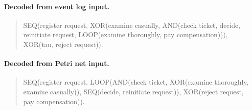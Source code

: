 \documentclass[applsci,supfile,submit,pdftex,moreauthors]{Definitions/mdpi}
\begin{document}
\paragraph{Decoded from event log input.}
\begin{quote}\ttfamily\small\raggedright
SEQ(register request, XOR(examine casually,
AND(check ticket, decide, reinitiate request,
LOOP(examine thoroughly, pay compensation))),
XOR(tau, reject request)).
\end{quote}

\paragraph{Decoded from Petri net input.}
\begin{quote}\ttfamily\small\raggedright
SEQ(register request, LOOP(AND(check ticket,
XOR(examine thoroughly, examine casually)),
SEQ(decide, reinitiate request)),
XOR(reject request, pay compensation)).
\end{quote}
\end{document}
